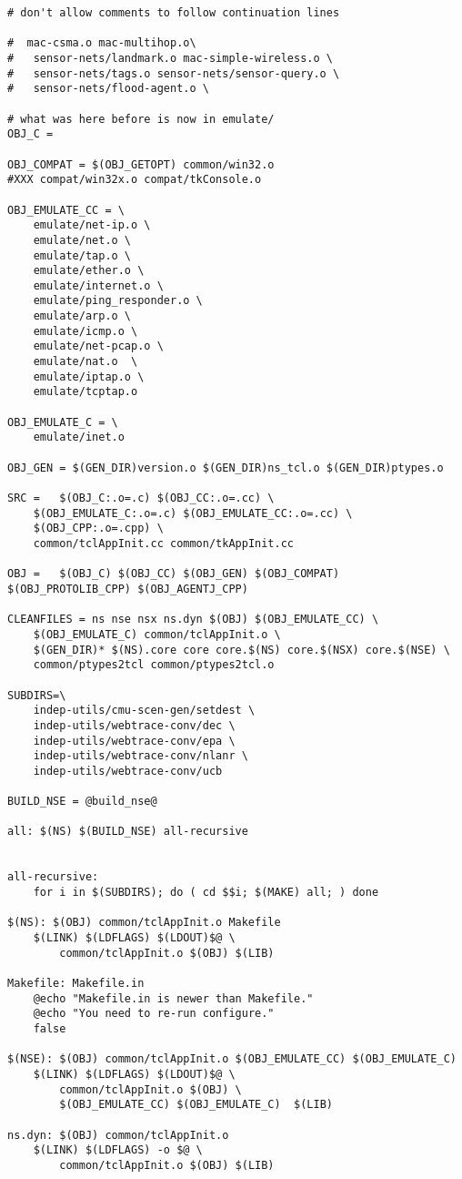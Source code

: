 \begin{verbatim}
# don't allow comments to follow continuation lines

#  mac-csma.o mac-multihop.o\
#	sensor-nets/landmark.o mac-simple-wireless.o \
#	sensor-nets/tags.o sensor-nets/sensor-query.o \
#	sensor-nets/flood-agent.o \

# what was here before is now in emulate/
OBJ_C =

OBJ_COMPAT = $(OBJ_GETOPT) common/win32.o
#XXX compat/win32x.o compat/tkConsole.o

OBJ_EMULATE_CC = \
	emulate/net-ip.o \
	emulate/net.o \
	emulate/tap.o \
	emulate/ether.o \
	emulate/internet.o \
	emulate/ping_responder.o \
	emulate/arp.o \
	emulate/icmp.o \
	emulate/net-pcap.o \
	emulate/nat.o  \
	emulate/iptap.o \
	emulate/tcptap.o

OBJ_EMULATE_C = \
	emulate/inet.o

OBJ_GEN = $(GEN_DIR)version.o $(GEN_DIR)ns_tcl.o $(GEN_DIR)ptypes.o

SRC =	$(OBJ_C:.o=.c) $(OBJ_CC:.o=.cc) \
	$(OBJ_EMULATE_C:.o=.c) $(OBJ_EMULATE_CC:.o=.cc) \
	$(OBJ_CPP:.o=.cpp) \
	common/tclAppInit.cc common/tkAppInit.cc 

OBJ =	$(OBJ_C) $(OBJ_CC) $(OBJ_GEN) $(OBJ_COMPAT) $(OBJ_PROTOLIB_CPP) $(OBJ_AGENTJ_CPP)

CLEANFILES = ns nse nsx ns.dyn $(OBJ) $(OBJ_EMULATE_CC) \
	$(OBJ_EMULATE_C) common/tclAppInit.o \
	$(GEN_DIR)* $(NS).core core core.$(NS) core.$(NSX) core.$(NSE) \
	common/ptypes2tcl common/ptypes2tcl.o 

SUBDIRS=\
	indep-utils/cmu-scen-gen/setdest \
	indep-utils/webtrace-conv/dec \
	indep-utils/webtrace-conv/epa \
	indep-utils/webtrace-conv/nlanr \
	indep-utils/webtrace-conv/ucb

BUILD_NSE = @build_nse@

all: $(NS) $(BUILD_NSE) all-recursive


all-recursive:
	for i in $(SUBDIRS); do ( cd $$i; $(MAKE) all; ) done

$(NS): $(OBJ) common/tclAppInit.o Makefile
	$(LINK) $(LDFLAGS) $(LDOUT)$@ \
		common/tclAppInit.o $(OBJ) $(LIB)

Makefile: Makefile.in
	@echo "Makefile.in is newer than Makefile."
	@echo "You need to re-run configure."
	false

$(NSE): $(OBJ) common/tclAppInit.o $(OBJ_EMULATE_CC) $(OBJ_EMULATE_C)
	$(LINK) $(LDFLAGS) $(LDOUT)$@ \
		common/tclAppInit.o $(OBJ) \
		$(OBJ_EMULATE_CC) $(OBJ_EMULATE_C)  $(LIB) 

ns.dyn: $(OBJ) common/tclAppInit.o
	$(LINK) $(LDFLAGS) -o $@ \
		common/tclAppInit.o $(OBJ) $(LIB)


\end{verbatim}
